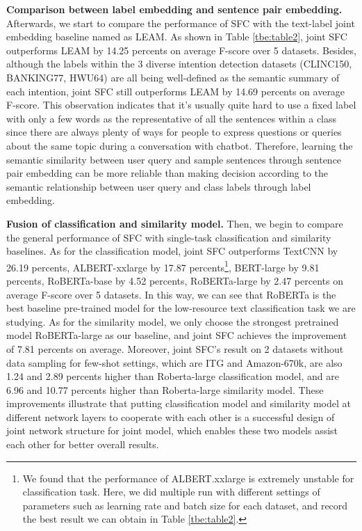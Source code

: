 \documentclass[letterpaper]{article} %
\begin{document}
  \textbf{Comparison  between  label  embedding  and  sentence  pair embedding.}
  Afterwards,  we  start  to  compare the performance of SFC with the text-label
  joint  embedding  baseline  named as LEAM. As shown in Table \ref{tbe:table2},
  joint  SFC outperforms LEAM by 14.25 percents on average F-score over 5
  datasets.  Besides,  although the labels within the 3 diverse intention detection
  datasets  (CLINC150,  BANKING77,  HWU64)  are  all  being  well-defined as the
  semantic  summary  of  each intention, joint SFC still outperforms LEAM by
  14.69  percents  on  average  F-score.  This  observation  indicates that it's
  usually  quite  hard  to  use  a  fixed  label  with  only  a few words as the
  representative  of  all  the  sentences  within a class since there are always
  plenty of ways for people to express questions or queries about the same topic
  during   a   conversation  with  chatbot.  Therefore,  learning  the  semantic
  similarity  between  user  query  and  sample  sentences through sentence pair
  embedding  can be more reliable than making decision according to the semantic
  relationship between user query and class labels through label embedding.

  \textbf{Fusion  of  classification  and  similarity  model.} Then, we begin to
  compare  the  general  performance  of SFC with single-task classification and
  similarity  baselines.  As  for  the  classification  model,  joint SFC
  outperforms    TextCNN    by   26.19   percents,   ALBERT-xxlarge   by   17.87
  percents\footnote{We found that the performance of ALBERT.xxlarge is extremely
  unstable  for  classification  task.  Here, we did multiple run with different
  settings  of parameters such as learning rate and batch size for each dataset,
  and  record  the  best  result  we  can  obtain  in  Table \ref{tbe:table2}.},
  BERT-large  by  9.81 percents, RoBERTa-base by 4.52 percents, RoBERTa-large by
  2.47 percents on average F-score over 5 datasets. In this way, we can see that
  RoBERTa  is  the  best  baseline  pre-trained  model for the low-resource text
  classification  task  we  are  studying.  As for the similarity model, we only
  choose  the  strongest  pretrained  model  RoBERTa-large  as our baseline, and
  joint  SFC  achieves  the  improvement  of  7.81  percents  on average.
  Moreover,  joint  SFC's  result on 2 datasets without data sampling for
  few-shot  settings,  which  are  ITG  and  Amazon-670k, are also 1.24 and 2.89
  percents  higher  than  Roberta-large  classification  model, and are 6.96 and
  10.77  percents higher than Roberta-large similarity model. These improvements
  illustrate that putting classification model and similarity model at different
  network  layers  to  cooperate  with  each  other  is  a  successful design of
  joint network structure for joint model, which enables these two models
  assist each other for better overall results.
\end{document}
